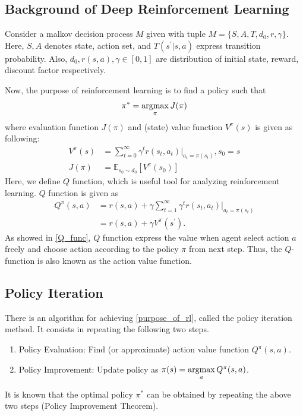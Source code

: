 \documentclass[english, dvipdfmx]{ampmt}             %
\newcommand{\argmax}{\mathop{\rm argmax}\limits}
\newcommand{\expect}{\mathbb{E}}
\begin{document}
\subsection{Background of Deep Reinforcement Learning}
Consider a malkov decision process $M$ given with tuple $M=\{S,A,T,d_0,r,\gamma\}$. Here, $S,A$ denotes state, action set, and $T(s^{'}|s,a)$ express transition probability. Also, $d_0,r(s,a),\gamma\in[0,1]$ are distribution of initial state, reward, discount factor respectively. \par
Now, the purpose of reinforcement learning is to find a policy such that
\begin{equation}
	\pi^{*}=\argmax_{\pi}J(\pi) \label{purpose_of_rl}
\end{equation} 
where evaluation function $J(\pi)$ and (state) value function $V^{\pi}(s)$ is given as following:
\begin{align}
	V^{\pi}(s) &= \sum_{t=0}^{\infty}\gamma^tr(s_t, a_t)|_{a_t=\pi(s_t)}, s_0 = s\\
	J(\pi) &= \expect_{s_0\sim d_0}[V^{\pi}(s_0)]
\end{align}
Here, we define $Q$ function, which is useful tool for analyzing reinforcement learning. $Q$ function is given as 
\begin{align}
	Q^{\pi}(s,a) &= r(s, a) + \gamma\sum_{t=1}^{\infty}\gamma^tr(s_t, a_t)|_{a_t=\pi(s_t)} \nonumber\\
			    &= r(s, a) + \gamma V^{\pi}(s^{\prime}). \label{Q_func}
\end{align}
As showed in \eqref{Q_func}, $Q$ function express the value when agent select action $a$ freely and choose action according to the policy $\pi$ from next step. Thus, the $Q$-function is also known as the action value function.


\subsection{Policy Iteration}
There is an algorithm for achieving \eqref{purpose_of_rl}, called the policy iteration method. It consists in repeating the following two steps.
\begin{enumerate}
	\item Policy Evaluation: Find (or approximate) action value function $Q^{\pi}(s,a)$.
	\item Policy Improvement: Update policy as $\pi(s)=\argmax_aQ^{\pi}(s,a)$.
\end{enumerate}
It is known that the optimal policy $\pi^{*}$ can be obtained by repeating the above two steps (Policy Improvement Theorem).
\end{document}
